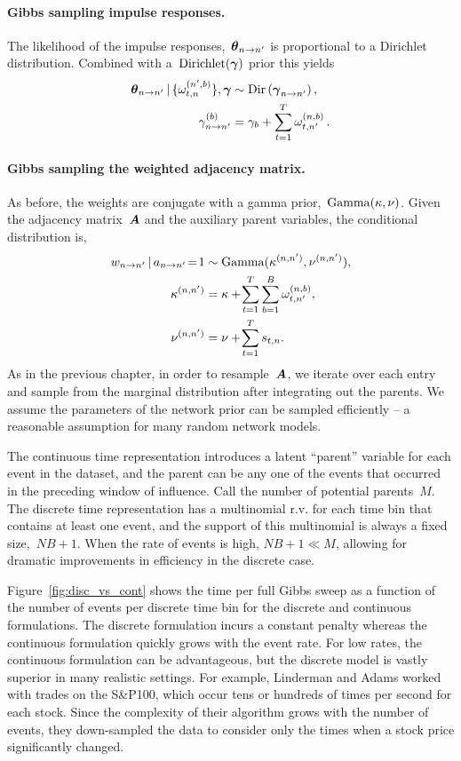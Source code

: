 \paragraph{Gibbs sampling impulse responses.}
The likelihood of the impulse responses,~$\boldsymbol{\theta}_{n \to n'}$ is
proportional to a Dirichlet distribution.  Combined with
a~$\text{Dirichlet}(\boldsymbol{\gamma})$ prior this yields
\begin{align*}
  \boldsymbol{\theta}_{n \to n'} \,|\, \{\omega_{t,n}^{(n',b)}\}, \boldsymbol{\gamma}
  &\sim \mathrm{Dir}\left( \boldsymbol{\gamma}_{n \to n'} \right), \\
  \gamma_{n \to n'}^{(b)} &=  \gamma_b + \sum_{t=1}^T \omega_{t,n'}^{(n, b)}\,.
\end{align*}

\paragraph{Gibbs sampling the weighted adjacency matrix.}
As before, the weights are conjugate with a gamma
prior,~$\mathrm{Gamma}(\kappa, \nu)$.  Given the adjacency matrix~$\boldsymbol{A}$
and the auxiliary parent variables, the conditional distribution is,
\begin{align*}
  w_{n \to n'} \,|\, a_{n \to n'}\!=\!1
  &\sim \mathrm{Gamma}(\kappa^{(n,n')}, \nu^{(n,n')}), \\
  \kappa^{(n,n')} &= \kappa +\! \sum_{t=1}^T \sum_{b=1}^B \omega_{t,n'}^{(n,b)}, \\
  \nu^{(n,n')} &= \nu +\! \sum_{t=1}^T s_{t,n}.
\end{align*}
As in the previous chapter, in order to resample~$\boldsymbol{A}$, we iterate over
each entry and sample from the marginal distribution after integrating
out the parents. We assume the parameters of the network prior can be
sampled efficiently -- a reasonable assumption for many random network
models.

The continuous time representation introduces a latent ``parent''
variable for each event in the dataset, and the parent can be any one
of the events that occurred in the preceding window of influence. Call
the number of potential parents~$M$. The discrete time representation
has a multinomial r.v. for each time bin that contains at least one
event, and the support of this multinomial is always a fixed
size,~${NB+1}$.  When the rate of events is high, $NB+1 \ll M$,
allowing for dramatic improvements in efficiency in the discrete case.

Figure~\ref{fig:disc_vs_cont} shows the time per full Gibbs sweep as a
function of the number of events per discrete time bin for the
discrete and continuous formulations. The discrete formulation incurs
a constant penalty whereas the continuous formulation quickly grows
with the event rate. For low rates, the continuous formulation can be
advantageous, but the discrete model is vastly superior in many
realistic settings. For example, Linderman and Adams worked with
trades on the S\&P100, which occur tens or hundreds of times per
second for each stock. Since the complexity of their algorithm grows
with the number of events, they down-sampled the data to consider only
the times when a stock price significantly changed.

